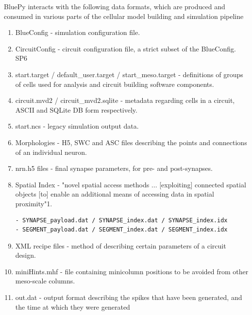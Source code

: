BluePy interacts with the following data formats, which are produced and
consumed in various parts of the cellular model building and simulation pipeline
\begin{enumerate}
  \item BlueConfig - simulation configuration file.

  \item CircuitConfig - circuit configuration file, a strict subset of the BlueConfig.
SP6

  \item start.target / default\_user.target / start\_meso.target - definitions
  of groups of cells used for analysis and circuit building software components.

  \item circuit.mvd2 / circuit\_mvd2.sqlite - metadata regarding cells in a
  circuit, ASCII and SQLite DB form respectively.

  \item start.ncs - legacy simulation output data.

  \item Morphologies - H5, SWC and ASC files describing the points and connections of an individual neuron.

  \item nrn.h5 files - final synapse parameters, for pre- and post-synapses.

  \item Spatial Index - "novel spatial access methods ... [exploiting] connected
  spatial objects [to] enable an additional means of accessing data in spatial
  proximity"1.

\begin{verbatim}
- SYNAPSE_payload.dat / SYNAPSE_index.dat / SYNAPSE_index.idx
- SEGMENT_payload.dat / SEGMENT_index.dat / SEGMENT_index.idx
\end{verbatim}

  \item XML recipe files - method of describing certain parameters of a circuit design.

  \item miniHints.mhf - file containing minicolumn positions to be avoided from other meso-scale columns.

  \item out.dat - output format describing the spikes that have been generated, and the time at which they were generated

\end{enumerate}

